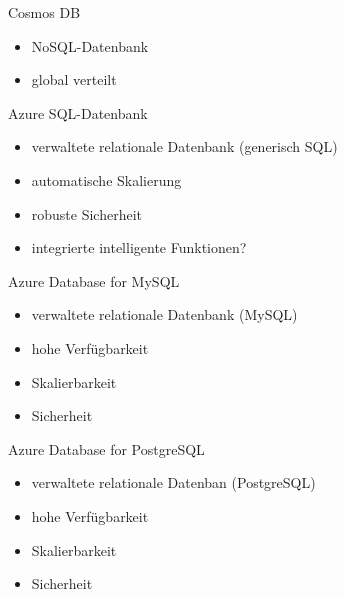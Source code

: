 \begin{flashcard}[Definition]{Cosmos DB}
    \begin{itemize}
        \item NoSQL-Datenbank
        \item global verteilt
    \end{itemize}
\end{flashcard}

\begin{flashcard}[Definition]{Azure SQL-Datenbank}
    \begin{itemize}
        \item verwaltete relationale Datenbank (generisch SQL)
        \item automatische Skalierung
        \item robuste Sicherheit
        \item integrierte intelligente Funktionen?
    \end{itemize}
\end{flashcard}

\begin{flashcard}[Describe]{Azure Database for MySQL}
    \begin{itemize}
        \item verwaltete relationale Datenbank (MySQL)
        \item hohe Verfügbarkeit
        \item Skalierbarkeit
        \item Sicherheit
    \end{itemize}
\end{flashcard}

\begin{flashcard}[Definition]{Azure Database for PostgreSQL}
    \begin{itemize}
        \item verwaltete relationale Datenban (PostgreSQL)
        \item hohe Verfügbarkeit
        \item Skalierbarkeit
        \item Sicherheit
    \end{itemize}
\end{flashcard}

